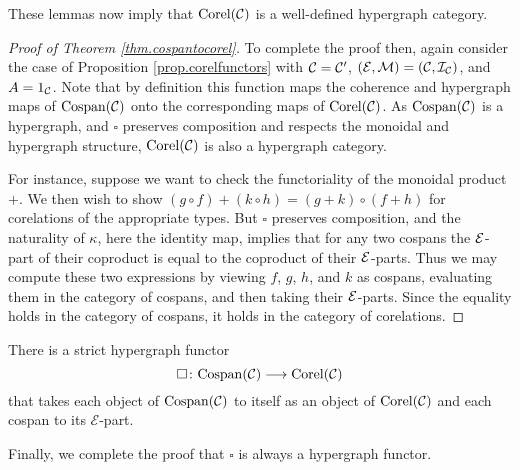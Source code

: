 These lemmas now imply that $\operatorname{{Corel}}(\mathcal C)$ is a well-defined hypergraph
category.
\begin{proof}[Proof of Theorem \ref{thm.cospantocorel}]
  To complete the proof then, again consider the case of Proposition
  \ref{prop.corelfunctors} with $\mathcal C = \mathcal C'$, $(\mathcal E,\mathcal M) = (\mathcal C, \mathcal
  I_{\mathcal C})$, and $A = 1_{\mathcal C}$. Note that by definition this function maps
  the coherence and hypergraph maps of $\operatorname{{Cospan}}(\mathcal C)$ onto the corresponding
  maps of $\operatorname{{Corel}}(\mathcal C)$. As $\operatorname{{Cospan}}(\mathcal C)$ is a hypergraph, and $\square$
  preserves composition and respects the monoidal and hypergraph structure,
  $\operatorname{{Corel}}(\mathcal C)$ is also a hypergraph category. 
  
  For instance, suppose we want to check the functoriality of the monoidal
  product $+$. We then wish to show $(g \circ f) + (k \circ h) = (g + k) \circ
  (f + h)$ for corelations of the appropriate types.  But $\square$ preserves
  composition, and the naturality of $\kappa$, here the identity map, implies
  that for any two cospans the $\mathcal E$-part of their coproduct is equal to the
  coproduct of their $\mathcal E$-parts. Thus we may compute these two expressions by
  viewing $f$, $g$, $h$, and $k$ as cospans, evaluating them in the category of
  cospans, and then taking their $\mathcal E$-parts. Since the equality holds in the
  category of cospans, it holds in the category of corelations.
\end{proof}

\begin{corollary}
  There is a strict hypergraph functor 
  \[
    \square{\colon} \mathrm{Cospan}(\mathcal C) \longrightarrow \mathrm{Corel}(\mathcal C)
  \]
  that takes each object of $\operatorname{{Cospan}}(\mathcal C)$ to itself as an object of
  $\operatorname{{Corel}}(\mathcal C)$ and each cospan to its $\mathcal E$-part.
\end{corollary}

  Finally, we complete the proof that $\square$ is always a hypergraph functor.

